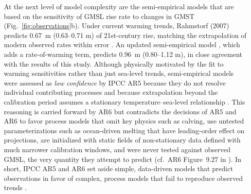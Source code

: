 \documentclass[12pt]{article}
\begin{document}
At the next level of model complexity are the semi-empirical models that are based on the sensitivity of GMSL rise rate to changes in GMST (Fig.~\ref{fig:observations}b). Under current warming trends, Rahmstorf (2007) \citep{Rahmstorf2007} predicts 0.67~m (0.63--0.71 m) of 21st-century rise, matching the extrapolation of modern observed rates within error \citep{Hamlington2024}. An updated semi-empirical model \citep{Vermeer2009}, which adds a rate-of-warming term, predicts 0.96~m (0.80--1.12 m), in close agreement with the results of this study. Although physically motivated by the fit to warming sensitivities rather than just sea-level trends, semi-empirical models were assessed as \emph{low confidence} by IPCC AR5 because they do not resolve individual contributing processes and because extrapolation beyond the calibration period assumes a stationary temperature--sea-level relationship \citep{Church2013}. This reasoning is carried forward by AR6 but contradicts the decisions of AR5 and AR6 to favor process models that omit key physics such as calving, use untested parameterizations such as ocean-driven melting that have leading-order effect on projections, are initialized with static fields of non-stationary data defined with much narrower calibration windows, and were never tested against observed GMSL, the very quantity they attempt to predict (cf.\ AR6 Figure~9.27 in \citep{Fox-Kemper2021}). In short, IPCC AR5 and AR6 set aside simple, data-driven models that predict observations in favor of complex, process models that fail to reproduce observed trends \citep{Aschwanden2021}. 
\end{document}
